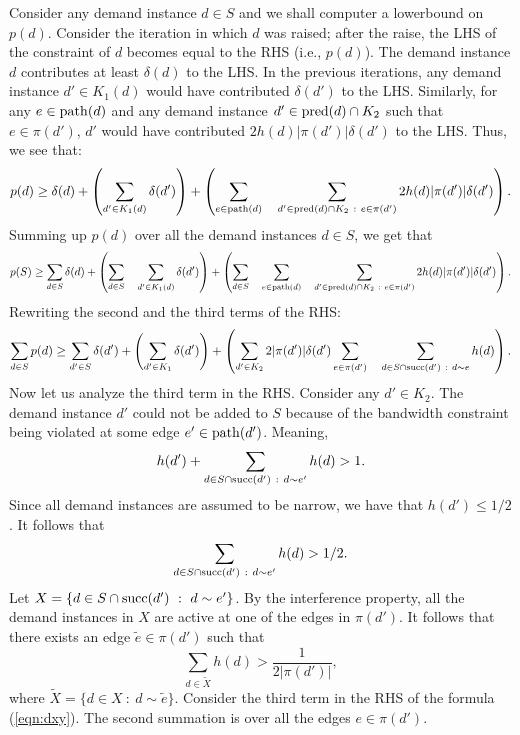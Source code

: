 \documentclass[11pt]{article}
\newcommand{\wt}[1] {\widetilde{#1}}
\newcommand{\mypath} {{\rm path}}
\newcommand{\mypred} {{\rm pred}}
\newcommand{\mysucc} {{\rm succ}}
\begin{document}
Consider any demand instance $d\in S$ and we shall computer a lowerbound on $p(d)$.
Consider the iteration in which $d$ was raised; after the raise, the LHS of the constraint
of $d$ becomes equal to the RHS (i.e., $p(d)$). 
The demand instance $d$ contributes at least $\delta(d)$ to the LHS.
In the previous iterations, any demand instance $d'\in K_1(d)$ would have contributed $\delta(d')$ to the LHS.
Similarly, for any $e\in \mypath(d)$ and any demand instance $d'\in \mypred(d)\cap K_2$ such that $e\in \pi(d')$,
$d'$ would have contributed $2h(d)|\pi(d')|\delta(d')$ to the LHS. Thus, we see that:
\begin{eqnarray*}
p(d) 
\geq 
\delta(d) 
+ \left(\sum_{d'\in K_1(d)} \delta(d')\right) 
+ \left(\sum_{e\in \mypath(d)} \quad \sum_{d'\in \mypred(d)\cap K_2~:~e\in \pi(d')} 2h(d)|\pi(d')|\delta(d')\right).
\end{eqnarray*}
Summing up $p(d)$ over all the demand instances $d\in S$, we get that
\begin{eqnarray*}
p(S) 
\geq 
\sum_{d\in S} \delta(d) 
+ \left(\sum_{d\in S} \quad \sum_{d'\in K_1(d)} \delta(d')\right) 
+ \left(\sum_{d\in S} \quad \sum_{e\in \mypath(d)} \quad \sum_{d'\in \mypred(d)\cap K_2~:~e\in \pi(d')} 2h(d)|\pi(d')|\delta(d')\right).
\end{eqnarray*}
Rewriting the second and the third terms of the RHS:
\begin{eqnarray}
\label{eqn:dxy}
\sum_{d\in S} p(d) 
\geq 
\sum_{d'\in S} \delta(d') 
+ \left(\sum_{d'\in K_1} \delta(d')\right)
+ \left(\sum_{d'\in K_2} 2 |\pi(d')|\delta(d') \sum_{e\in \pi(d')} \quad \sum_{d\in S\cap \mysucc(d')~:~d\sim e} h(d)\right).
\end{eqnarray}
Now let us analyze the third term in the RHS.
Consider any $d'\in K_2$.
The demand instance $d'$ could not be added to $S$ because of the bandwidth constraint being
violated at some edge $e'\in \mypath(d')$. Meaning,
\[
h(d') + \sum_{d\in S\cap \mysucc(d')~:~d\sim e'} h(d) > 1.
\]
Since all demand instances are assumed to be narrow, we have that $h(d')\leq 1/2$. 
It follows that 
\[
\sum_{d\in S\cap \mysucc(d')~:~d\sim e'} h(d) > 1/2.
\]
Let $X=\{d\in S\cap \mysucc(d')~:~d\sim e'\}$.
By the interference property, all the demand instances in $X$ are active
at one of the edges in $\pi(d')$.
It follows that there exists an edge $\wt{e}\in \pi(d')$ such that 
\[
\sum_{d\in \wt{X}} h(d) > \frac{1}{2|\pi(d')|},
\]
where $\wt{X}=\{d\in X~:~d\sim \wt{e}\}$.
Consider the third term in the RHS of the formula (\ref{eqn:dxy}).
The second summation is over all the edges $e\in \pi(d')$.
\end{document}
